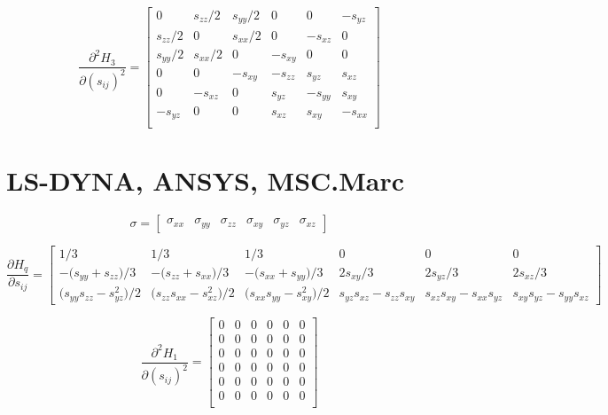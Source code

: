 \documentclass{article}
\begin{document}
\begin{landscape}
\begin{equation}
\frac{\partial^2 H_{3}}{\partial (s_{ij})^2} = 
	\begin{bmatrix} 
	0 & s_{zz}/2 & s_{yy}/2 & 0 & 0 & -s_{yz} \\
	s_{zz}/2 & 0 & s_{xx}/2 & 0 & -s_{xz} & 0 \\
	s_{yy}/2 & s_{xx}/2 & 0 & -s_{xy} & 0 & 0 \\
	0 & 0 & -s_{xy} & -s_{zz} & s_{yz} & s_{xz} \\
	0 & -s_{xz} & 0 & s_{yz} & -s_{yy} & s_{xy} \\
	 -s_{yz} & 0 & 0 & s_{xz} & s_{xy} & -s_{xx} \\
	\end{bmatrix}
\end{equation}

\newpage

\section{LS-DYNA, ANSYS, MSC.Marc}

\begin{equation}
\sigma = \begin{bmatrix} \sigma_{xx} & \sigma_{yy} & \sigma_{zz} & \sigma_{xy} & \sigma_{yz} & \sigma_{xz} \end{bmatrix}
\end{equation}

\begin{equation}
\frac{\partial H_{q}}{\partial s_{ij}} = 
	\begin{bmatrix} 
	1/3 & 1/3 & 1/3 & 0 & 0 & 0 \\
	-\big(s_{yy}+s_{zz}\big)/3 & -\big(s_{zz}+s_{xx}\big)/3 & -\big(s_{xx}+s_{yy}\big)/3 & 2s_{xy}/3 & 2s_{yz}/3 &2 s_{xz}/3 \\
	\big(s_{yy}s_{zz} - s^{2}_{yz}\big)/2 & \big(s_{zz}s_{xx} - s^{2}_{xz}\big)/2 & \big(s_{xx}s_{yy} - s^{2}_{xy}\big)/2 & s_{yz}s_{xz} -s_{zz}s_{xy} & s_{xz}s_{xy} -s_{xx}s_{yz} & s_{xy}s_{yz} -s_{yy}s_{xz} 

	\end{bmatrix}
\end{equation}


\begin{equation}
\frac{\partial^2 H_{1}}{\partial (s_{ij})^2} = 
	\begin{bmatrix} 
	0 & 0 & 0 & 0 & 0 & 0 \\
	0 & 0 & 0 & 0 & 0 & 0 \\
	0 & 0 & 0 & 0 & 0 & 0 \\
	0 & 0 & 0 & 0 & 0 & 0 \\
	0 & 0 & 0 & 0 & 0 & 0 \\
	0 & 0 & 0 & 0 & 0 & 0 \\
	\end{bmatrix}
\end{equation}


\end{landscape}
\end{document}
